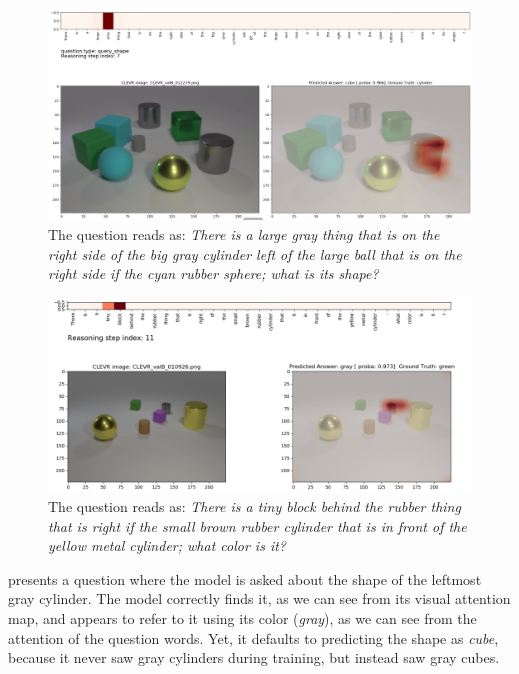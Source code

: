 \begin{figure}[]
	\centering
	\includegraphics[width=\textwidth]{img/fail_mac_cogent_b_shape.png}
	\caption{The question reads as: \textit{There is a large gray thing that is on the right side of the big gray cylinder left of the large ball that is on the right side if the cyan rubber sphere; what is its shape?}}
	\label{fig:fail_mac_shape}
\end{figure}

\begin{figure}[]
	\centering
	\includegraphics[width=\textwidth]{img/fail_mac_cogent_b_color.png}
	\caption{The question reads as: \textit{There is a tiny block behind the rubber thing that is right if the small brown rubber cylinder that is in front of the yellow metal cylinder; what color is it?}}
	\label{fig:fail_mac_color}
\end{figure}

 presents a question where the model is asked about the shape of the leftmost gray cylinder. The model correctly finds it, as we can see from its visual attention map, and appears to refer to it using its color (\textit{gray}), as we can see from the attention of the question words. Yet, it defaults to predicting the shape as \textit{cube}, because it never saw gray cylinders during training, but instead saw gray cubes.

